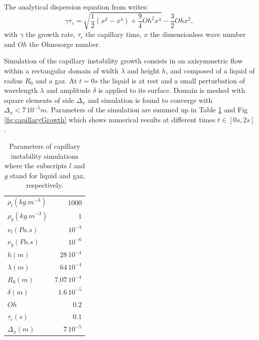 \documentclass[onecolumn, 12pt]{asme2ej}
\begin{document}
The analytical dispersion equation from \cite{chandrasekhar2013hydrodynamic} writes:
\begin{equation}
    \gamma \tau_c = \sqrt{\frac{1}{2}(x^{2}-x^{4}) + \frac{9}{4}Oh^{2}x^{4}}-\frac{3}{2}Oh x^{2},
    \label{eq:growthRateAnalytical}
\end{equation}
with $\gamma$ the growth rate, $\displaystyle \tau_c $ the capillary time, $x$ the dimensionless wave number and $Oh$ the Ohnesorge number.


Simulation of the capillary instability growth consists in an axisymmetric flow within a rectangular domain of width $\lambda$ and height $h$, and composed of a liquid of radius $R_0$ and a gaz. At $t = 0s$ the liquid is at rest and a small perturbation of wavelength $\lambda$ and amplitude $\delta$ is applied to its surface. 
Domain is meshed with square elements of side $\Delta_x$ and simulation is found to converge with $\Delta_x< 7\,10^{-5}m$. Parameters of the simulation are summed up in Table \ref{tab:parametersPinch} and Fig \ref{fig:capillaryGrowth} which shows numerical results at different times $t \in [0s,2s]$.

\begin{table}
    \begin{center}
        \begin{tabular}{lr}
            \hline
            $\rho_{l} (kg.m^{-3})$ & $1000$\\
            $\rho_{g} (kg.m^{-3})$ & $1$\\
            $\nu_{l} (Pa.s)$ & $10^{-3}$\\
            $\nu_{g} (Pa.s)$ & $10^{-6}$\\
            $h(m)$ & $28\, 10^{-4}$\\
            $\lambda (m)$ & $64\, 10^{-4}$\\
            $R_0(m)$ & $7.07\, 10^{-4}$\\
            $\delta (m)$ & $1.6\, 10^{-5}$\\
            $Oh$ & $0.2$\\
            $\tau_{c}(s)$ & $0.1$  \\   
            $\Delta_x(m)$ & $7\,10^{-5}$ \\      
            \hline
        \end{tabular}
    \end{center}
    
    \caption{\label{tab:parametersPinch}Parameters of capillary instability simulations where the subscripts $l$ and $g$ stand for liquid and gaz, respectively.}
\end{table}
\end{document}
